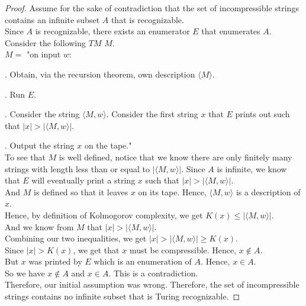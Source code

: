 \documentclass[12pt]{article}
\begin{document}
\begin{proof}
Assume for the sake of contradiction that the set of incompressible strings contains an infinite subset $A$ that is recognizable. \\

Since $A$ is recognizable, there exists an enumerator $E$ that enumerates $A$. \\

Consider the following $TM$ $M$. \\

$M = $ "on input $w$: \\

\setlength\parindent{15pt}

. Obtain, via the recursion theorem, own description $\langle M \rangle$. 

. Run $E$. 

. Consider the string $\langle M, w \rangle$. Consider the first string $x$ that $E$ prints out such that \indent \indent $|x| > |\langle M, w \rangle|$. 

. Output the string $x$ on the tape." \\

\setlength\parindent{0pt}
To see that $M$ is well defined, notice that we know there are only finitely many strings with length less than or equal to $|\langle M, w \rangle|$. Since $A$ is infinite, we know that $E$ will eventually print a string $x$ such that $|x| > |\langle M, w \rangle|$. \\

And $M$ is defined so that it leaves $x$ on its tape. Hence, $\langle M, w \rangle$ is a description of $x$. \\

Hence, by definition of Kolmogorov complexity, we get $K(x) \leq |\langle M, w \rangle|$. \\

And we know from $M$ that $|x| > |\langle M, w \rangle|$. \\

Combining our two inequalities, we get $|x| > |\langle M, w \rangle| \geq K(x)$. \\

Since $|x| > K(x)$, we get that $x$ must be compressible. Hence, $x \not \in A$. \\

But $x$ was printed by $E$ which is an enumeration of $A$. Hence, $x \in A$. \\

So we have $x \not \in A$ and $x \in A$. This is a contradiction. \\

Therefore, our initial assumption was wrong. Therefore, the set of incompressible strings contains no infinite subset that is Turing recognizable. 

\end{proof}
\end{document}
